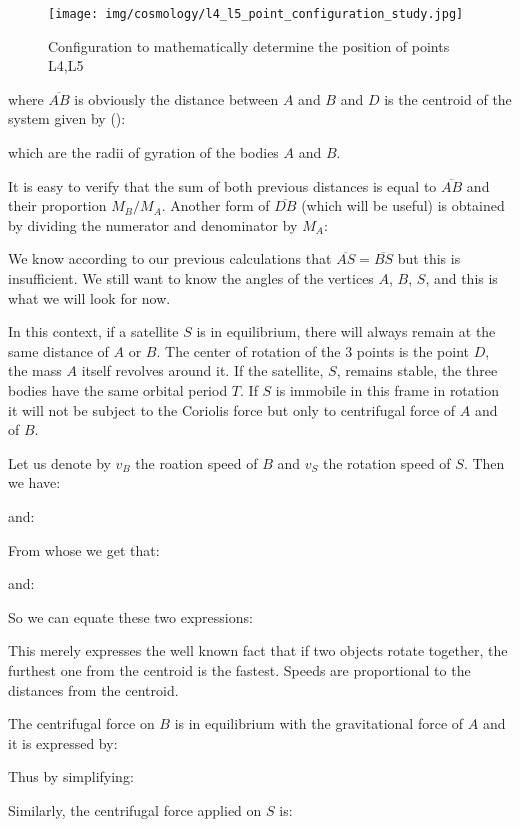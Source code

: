 	\begin{figure}[H]
		\begin{center}
		\texttt{[image: img/cosmology/l4\_l5\_point\_configuration\_study.jpg]}
		\end{center}	
		\caption[]{Configuration to mathematically determine the position of points L4,L5}
	\end{figure}
	where $\overline{AB}$ is obviously the distance between $A$ and $B$ and $D$ is the centroid of the system given by ():
	
	which are the radii of gyration of the bodies $A$ and $B$.

	It is easy to verify that the sum of both previous distances is equal to $\overline{AB}$ and their proportion $M_B/M_A$. Another form of $\overline{DB}$ (which will be useful) is obtained by dividing the numerator and denominator by $M_A$:
	
	We know according to our previous calculations that $\overline{AS}=\overline{BS}$ but this is insufficient. We still want to know the angles of the vertices $A$, $B$, $S$, and this is what we will look for now.

	In this context, if a satellite $S$ is in equilibrium, there will always remain at the same distance of $A$ or $B$. The center of rotation of the $3$ points is the point $D$, the mass $A$ itself revolves around it. If the satellite, $S$, remains stable, the three bodies have the same orbital period $T$. If $S$ is immobile in this frame in rotation it will not be subject to the Coriolis force but only to centrifugal force of $A$ and of $B$.
	
	Let us denote by $v_B$ the roation speed of $B$ and $v_S$ the rotation speed of $S$. Then we have:
	
	and:
	
	From whose we get that:
	
	and:
	
	So we can equate these two expressions:
	
	This merely expresses the well known fact that if two objects rotate together, the furthest one from the centroid is the fastest. Speeds are proportional to the distances from the centroid.

	The centrifugal force on $B$ is in equilibrium with the gravitational force of $A$ and it is expressed by:
	
	Thus by simplifying:
	
	Similarly, the centrifugal force applied on $S$ is:
	
